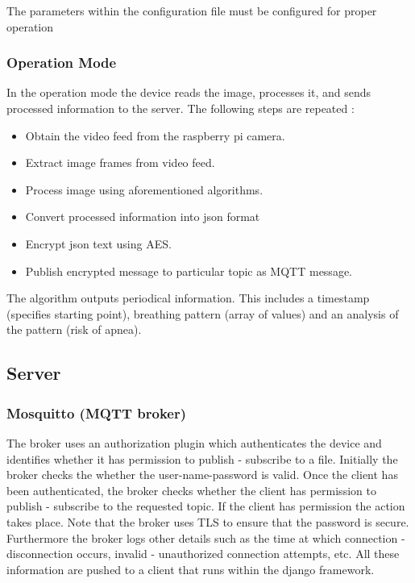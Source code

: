 \documentclass{report}
\begin{document}
    
The parameters within the configuration file must be configured for proper operation

\subsubsection{Operation Mode}

In the operation mode the device reads the image, processes it, and sends processed information to the server. The following steps are repeated :

\begin{itemize}
    \item Obtain the video feed from the raspberry pi camera.
    \item Extract image frames from video feed.
    \item Process image using aforementioned algorithms.
    \item Convert processed information into json format
    \item Encrypt json text using AES.
    \item Publish encrypted message to particular topic as MQTT message.
\end{itemize}

The algorithm outputs periodical information. This includes a timestamp (specifies starting point), breathing pattern (array of values) and an analysis of the pattern (risk of apnea).


\subsection{Server}

\subsubsection{Mosquitto (MQTT broker)}

The broker uses an authorization plugin which authenticates the device and identifies whether it has permission to publish - subscribe to a file.
Initially the broker checks the whether the user-name-password is valid. Once the client has been authenticated, the broker checks whether the client has permission to publish - subscribe to the requested topic. If the client has permission the action takes place. Note that the broker uses TLS to ensure that the password is secure.
Furthermore the broker logs other details such as the time at which connection - disconnection occurs, invalid - unauthorized connection attempts, etc.
All these information are pushed to a client that runs within the django framework.
\end{document}
